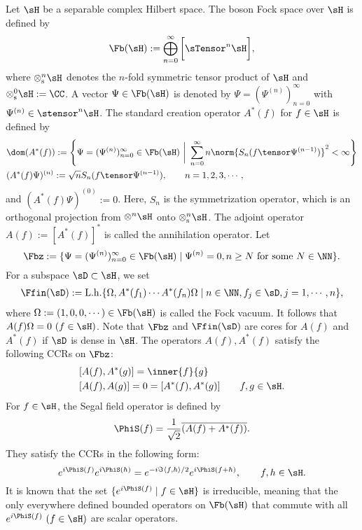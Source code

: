 \documentclass[12pt,draft]{article}
\theoremstyle{plain}
\numberwithin{equation}{section}
\theoremstyle{remark}
\begin{document}
Let $\sH$ be a separable complex Hilbert space. The boson Fock space over $\sH$ is defined by
\begin{align*}
  \Fb(\sH) := \bigoplus_{n=0}^\infty \bigg[ \sTensor^n \sH \bigg],
\end{align*}
where $\otimes_{\rm s}^n \sH$ denotes the $n$-fold symmetric tensor product of $\sH$ and $\otimes_{\rm s}^0 \sH:=\CC$.
A vector $\Psi \in \Fb(\sH)$ is denoted by $\Psi = (\Psi^{(n)})_{n=0}^\infty$ with 
$\Psi^{(n)}\in \stensor^n \sH$.
The standard creation operator $A^*(f)$ for $f\in\sH$ is defined by
\begin{align*}
& \dom(A^*(f)) := \left\{\Psi=(\Psi^{(n)})_{n=0}^\infty \in \Fb(\sH) ~\bigg|~ \sum_{n=0}^\infty n\norm{S_n(f\tensor\Psi^{(n-1)})}^2<\infty\right\} \\
& (A^*(f)\Psi)^{(n)} := \sqrt{n}S_n(f\tensor \Psi^{(n-1)}), \qquad n=1,2,3,\cdots,
\end{align*}
and $(A^*(f)\Psi)^{(0)}:=0$.
Here, $S_n$ is the symmetrization operator, which is an orthogonal projection from $\otimes^n \sH$ onto $\otimes_{\rm s}^n \sH$.
The adjoint operator $A(f) := [A^*(f)]^*$ is called the annihilation operator.
Let
\[
\Fbz := \{ \Psi=(\Psi^{(n)})_{n=0}^\infty \in \Fb(\sH) \mid \Psi^{(n)} = 0, n\geq N \text{ for some } N\in\NN \}.
\]
For a subspace $\sD \subset \sH$, we set 
\begin{align*}
 \Ffin(\sD) := \mathrm{L.h.}\{\Omega, A^*(f_1)\cdots A^*(f_n)\Omega \mid n\in\NN, f_j\in\sD, j=1,\cdots,n \},
\end{align*}
where $\Omega:=(1,0,0,\cdots)\in\Fb(\sH)$ is called the Fock vacuum.
It follows that $A(f)\Omega = 0 ~ (f\in\sH)$.
Note that $\Fbz$ and $\Ffin(\sD)$ are cores for $A(f)$ and $A^*(f)$ if $\sD$ is dense in $\sH$.
The operators $A(f), A^*(f)$ satisfy the following CCRs on $\Fbz$:
\begin{align*}
  & [A(f),A^*(g)] = \inner{f}{g} \\
  & [A(f),A(g)] = 0 = [A^*(f), A^*(g)]  ~~~~~~   f,g\in\sH.
\end{align*}
For $f\in\sH$, the Segal field operator is defined by
\begin{align*}
  \PhiS(f) = \frac{1}{\sqrt{2}} \overline{(A(f)+A^*(f))}.
\end{align*}
They satisfy the CCRs in the following form:
\[
 e^{i\PhiS(f)}e^{i\PhiS(h)} = e^{-i \Im\langle f,h\rangle /2}e^{i\PhiS(f+h)},
 \qquad f,h\in\sH.
\]
It is known that the set $\{e^{i\PhiS(f)} \mid f\in\sH\}$ is irreducible, 
meaning that the only everywhere defined bounded operators on $\Fb(\sH)$ 
that commute with all $e^{i\PhiS(f)} ~ (f\in\sH)$ are scalar operators. 
\end{document}

